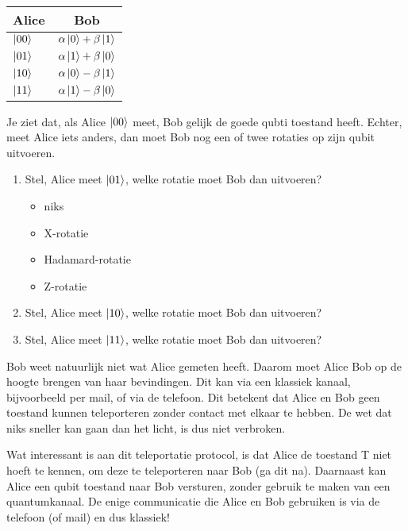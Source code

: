 \documentclass[10pt, a4paper]{article}
\begin{document}
\begin{table}
\begin{tabular}{l|c}
\textbf{Alice} & \textbf{Bob}\\ \hline
$\ket{00}$ & $\alpha\ket{0}+\beta\ket{1}$\\ \hline
$\ket{01}$ & $\alpha\ket{1}+\beta\ket{0}$\\ \hline
$\ket{10}$ & $\alpha\ket{0}-\beta\ket{1}$\\ \hline
$\ket{11}$ & $\alpha\ket{1}-\beta\ket{0}$\\ \hline
\end{tabular}
\end{table}

Je ziet dat, als Alice $\ket{00}$ meet, Bob gelijk de goede qubti toestand heeft. Echter, meet Alice iets anders, dan moet Bob nog een of twee rotaties op zijn qubit uitvoeren.

\begin{enumerate}[label=(\alph*)]
\item Stel, Alice meet $\ket{01}$, welke rotatie moet Bob dan uitvoeren?
\begin{itemize}
\item niks
\item X-rotatie
\item Hadamard-rotatie
\item Z-rotatie
\end{itemize}

\item Stel, Alice meet $\ket{10}$, welke rotatie moet Bob dan uitvoeren?

\item Stel, Alice meet $\ket{11}$, welke rotatie moet Bob dan uitvoeren?

\end{enumerate}

Bob weet natuurlijk niet wat Alice gemeten heeft. Daarom moet Alice Bob op de hoogte brengen van haar bevindingen. Dit kan via een klassiek kanaal, bijvoorbeeld per mail, of via de telefoon. Dit betekent dat Alice en Bob geen toestand kunnen teleporteren zonder contact met elkaar te hebben. De wet dat niks sneller kan gaan dan het licht, is dus niet verbroken.

Wat interessant is aan dit teleportatie protocol, is dat Alice de toestand T niet hoeft te kennen, om deze te teleporteren naar Bob (ga dit na). Daarnaast kan Alice een qubit toestand naar Bob versturen, zonder gebruik te maken van een quantumkanaal. De enige communicatie die Alice en Bob gebruiken is via de telefoon (of mail) en dus klassiek!
\end{document}
